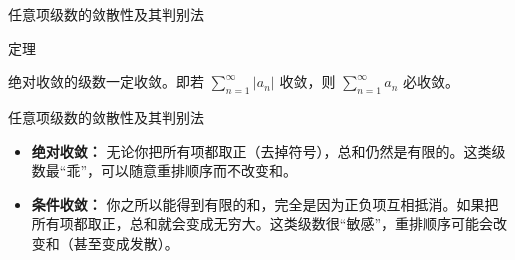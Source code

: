 \documentclass[aspectratio=169,10pt,fontset=fandol]{ctexbeamer}
\newenvironment{custom}[1]{\par\noindent\textbf{#1}\quad}{\par\vspace{0.8em}}
\begin{document}
\begin{frame}[t,fragile]{任意项级数的敛散性及其判别法}
\normalsize
\begin{block}{定理}
{\normalsize


	绝对收敛的级数一定收敛。即若 \(\sum\limits_{n = 1}^{  \infty } |a_n|\) 收敛，则 \(\sum\limits_{n = 1}^{  \infty } a_n\) 必收敛。


}
\end{block}
\end{frame}
\begin{frame}[t,fragile]{任意项级数的敛散性及其判别法}
\normalsize
{\normalsize
\begin{itemize}

		\item \textbf{绝对收敛：} 无论你把所有项都取正（去掉符号），总和仍然是有限的。这类级数最“乖”，可以随意重排顺序而不改变和。

		\item \textbf{条件收敛：} 你之所以能得到有限的和，完全是因为正负项互相抵消。如果把所有项都取正，总和就会变成无穷大。这类级数很“敏感”，重排顺序可能会改变和（甚至变成发散）。

	\end{itemize}


}
\end{frame}
\end{document}
